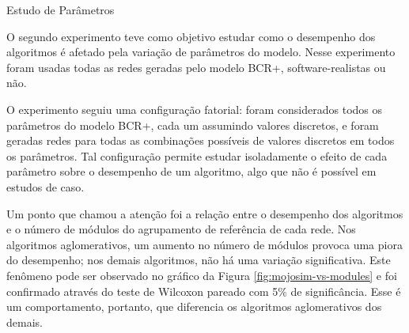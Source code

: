 \begin{section}{Estudo de Parâmetros}

O segundo experimento teve como objetivo estudar como o desempenho dos algoritmos é afetado pela variação de parâmetros do modelo. Nesse experimento foram usadas todas as redes geradas pelo modelo BCR+, software-realistas ou não.

O experimento seguiu uma configuração fatorial: foram considerados todos os parâmetros do modelo BCR+, cada um assumindo valores discretos, e foram geradas redes para todas as combinações possíveis de valores discretos em todos os parâmetros. Tal configuração permite estudar isoladamente o efeito de cada parâmetro sobre o desempenho de um algoritmo, algo que não é possível em estudos de caso.


Um ponto que chamou a atenção foi a relação entre o desempenho dos algoritmos e o número de módulos do agrupamento de referência de cada rede. Nos algoritmos aglomerativos, um aumento no número de módulos provoca uma piora do desempenho; nos demais algoritmos, não há uma variação significativa. Este fenômeno pode ser observado no gráfico da Figura \ref{fig:mojosim-vs-modules} e foi confirmado através do teste de Wilcoxon pareado com 5\% de significância. Esse é um comportamento, portanto, que diferencia os algoritmos aglomerativos dos demais. 


\end{section}
